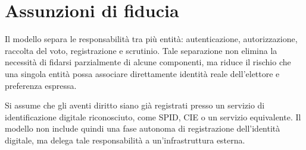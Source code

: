 \documentclass[a4paper,12pt]{article}
\begin{document}
\section{Assunzioni di fiducia}

Il modello separa le responsabilità tra più entità: autenticazione, autorizzazione, raccolta del voto,
registrazione e scrutinio. Tale separazione non elimina la necessità di fidarsi parzialmente di alcune
componenti, ma riduce il rischio che una singola entità possa associare direttamente identità reale
dell'elettore e preferenza espressa.

Si assume che gli aventi diritto siano già registrati presso un servizio di identificazione digitale
riconosciuto, come SPID, CIE o un servizio equivalente. Il modello non include quindi una fase autonoma
di registrazione dell'identità digitale, ma delega tale responsabilità a un'infrastruttura esterna.
\end{document}
